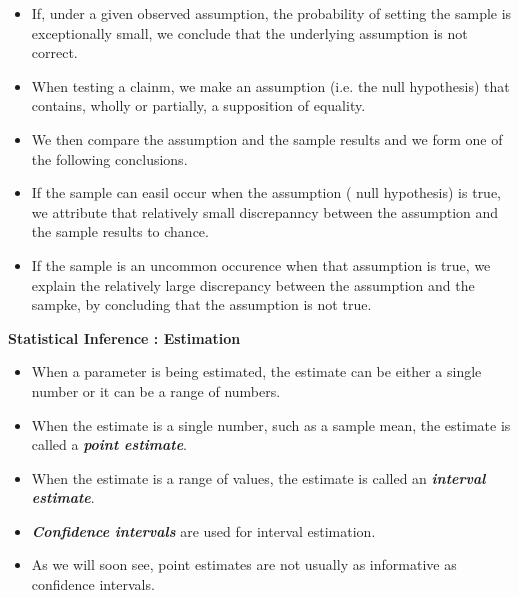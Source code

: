 \documentclass[]{report}
\begin{document}
\begin{itemize}\item 
If, under a given observed assumption, the probability of setting the sample is exceptionally small, we conclude that the underlying assumption is not correct.

\item When testing a clainm, we make an assumption (i.e. the null hypothesis) that contains, wholly or partially, a supposition of equality.

\item We then compare the assumption and the sample results and we form one of the following conclusions.

\item If the sample can easil occur when the assumption ( null hypothesis) is true, we attribute that relatively small discrepanncy between the assumption and the sample results to chance.

\item If the sample is an uncommon occurence when that assumption is true, we explain the relatively large discrepancy between the assumption and the sampke, by concluding that the assumption is not true.
\end{itemize}


\textbf{Statistical Inference : Estimation}
\begin{itemize}
\item When a parameter is being estimated, the estimate can be either a single number or it can be a range of numbers.
\item When the estimate is a single number, such as a sample mean, the estimate is called a \textbf{\emph{point estimate}}.
\item When the estimate is a range of values, the estimate is called an \textbf{\emph{interval estimate}}.
\item \textbf{\emph{Confidence intervals}} are used for interval estimation.
\item As we will soon see, point estimates are not usually as informative as confidence intervals.
\end{itemize}



\end{document}
